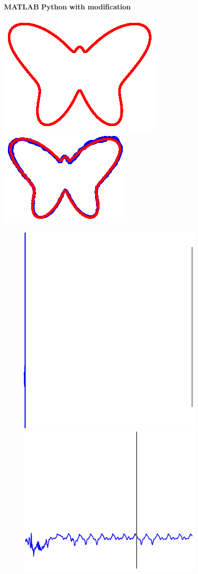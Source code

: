 
\begin{figure}


    \centering
    
    \hspace{2em}
    \textbf{MATLAB}\hspace{10em}
    \textbf{Python with modification}
    
    \hspace{-2em}
    \includegraphics[trim=3cm 4cm 3cm 4cm, clip=true, height=.25\linewidth]{Figures/Fig_T5/MATLAB/ST_T2_Seg3_Var_Trajectory.eps}
    \hspace{4em}
    \includegraphics[trim=6.5cm 4.5cm 6cm 4.5cm, clip=true,  height=.25\linewidth]{Figures/Fig_T5/ImprovP/ST_T2_Seg3_Var_Trajectory.eps} \\
    

    \textbf{}\begin{subfigure}{\textwidth}
        \centering

        \includegraphics[trim=0cm 0cm 0cm 0cm,clip=true,height=0.1\linewidth,width=.45\linewidth]{Figures/Fig_T5/MATLAB/ST_T2_Seg3_Var_Theta0.eps}
        \includegraphics[trim=2cm 1cm 2cm 1cm,clip=true,height=0.1\linewidth,width=.45\linewidth]{Figures/Fig_T5/ImprovP/ST_T2_Seg3_Var_Theta0.eps}


\end{subfigure}
\end{figure}
